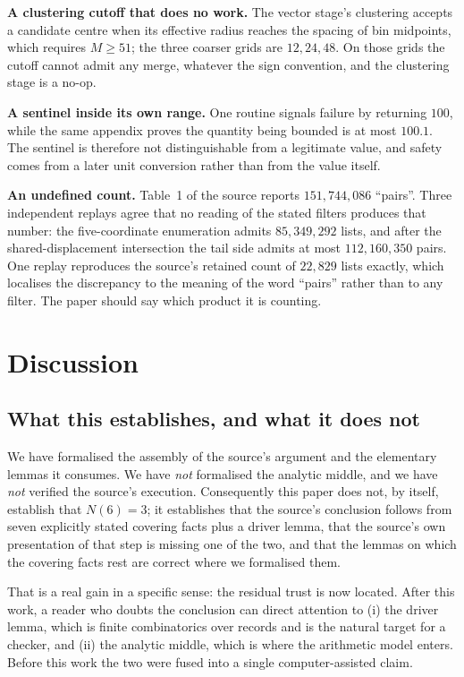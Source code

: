 \documentclass[11pt]{article}
\theoremstyle{definition}
\begin{document}
\textbf{A clustering cutoff that does no work.} The vector stage's clustering accepts a candidate
centre when its effective radius reaches the spacing of bin midpoints, which requires $M\ge51$; the
three coarser grids are $12,24,48$. On those grids the cutoff cannot admit any merge, whatever the
sign convention, and the clustering stage is a no-op.

\textbf{A sentinel inside its own range.} One routine signals failure by returning $100$, while the
same appendix proves the quantity being bounded is at most $100.1$. The sentinel is therefore not
distinguishable from a legitimate value, and safety comes from a later unit conversion rather than
from the value itself.

\textbf{An undefined count.} Table~1 of the source reports $151{,}744{,}086$ ``pairs''. Three
independent replays agree that no reading of the stated filters produces that number: the
five-coordinate enumeration admits $85{,}349{,}292$ lists, and after the shared-displacement
intersection the tail side admits at most $112{,}160{,}350$ pairs. One replay reproduces the
source's retained count of $22{,}829$ lists exactly, which localises the discrepancy to the meaning
of the word ``pairs'' rather than to any filter. The paper should say which product it is counting.

\section{Discussion}

\subsection{What this establishes, and what it does not}

We have formalised the assembly of the source's argument and the elementary lemmas it consumes. We
have \emph{not} formalised the analytic middle, and we have \emph{not} verified the source's
execution. Consequently this paper does not, by itself, establish that $N(6)=3$; it establishes that
the source's conclusion follows from seven explicitly stated covering facts plus a driver lemma,
that the source's own presentation of that step is missing one of the two, and that the lemmas on
which the covering facts rest are correct where we formalised them.

That is a real gain in a specific sense: the residual trust is now located. After this work, a
reader who doubts the conclusion can direct attention to (i) the driver lemma, which is finite
combinatorics over records and is the natural target for a checker, and (ii) the analytic middle,
which is where the arithmetic model enters. Before this work the two were fused into a single
computer-assisted claim.
\end{document}
